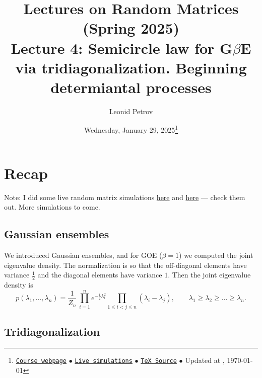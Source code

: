\documentclass[letterpaper,11pt,oneside,reqno]{article}
\numberwithin{equation}{section}
\theoremstyle{definition}
\begin{document}
\title{Lectures on Random Matrices
(Spring 2025)
\\Lecture 4: Semicircle law for G$\beta$E via tridiagonalization. Beginning determiantal processes}


\date{Wednesday, January 29, 2025\footnote{\href{https://lpetrov.cc/rmt25/}{\texttt{Course webpage}}
$\bullet$ \href{https://lpetrov.cc/simulations/model/random-matrices/}{\texttt{Live simulations}}
$\bullet$ \href{https://lpetrov.cc/rmt25/rmt25-notes/rmt2025-l04.tex}{\texttt{TeX Source}}
$\bullet$
Updated at \currenttime, \today}}



\author{Leonid Petrov}


\maketitle
\tableofcontents

\section{Recap}

Note: I did some live random matrix simulations
\href{https://lpetrov.cc/simulations/2025-01-28-goe/}{here}
and
\href{https://lpetrov.cc/simulations/2025-01-28-bbp-transition/}{here}
--- check them out. More simulations to come.

\subsection{Gaussian ensembles}

We introduced Gaussian ensembles,
and for GOE ($\beta=1$) we computed the joint eigenvalue density.
The normalization is so that the off-diagonal elements have variance $\frac{1}{2}$
and the diagonal elements have variance $1$.
Then the joint eigenvalue density is
\begin{equation*}
	p(\lambda_1,\ldots,\lambda_n)
	=
	\frac{1}{Z_n}\,
	\prod_{i=1}^n e^{-\frac{1}{2}\lambda_i^2}
	\prod_{1\le i<j\le n}(\lambda_i - \lambda_j),
	\qquad
	\lambda_1\ge \lambda_2\ge \ldots \ge \lambda_n.
\end{equation*}

\subsection{Tridiagonalization}
\end{document}
